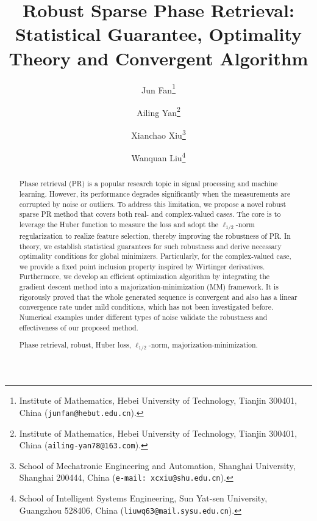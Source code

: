 \documentclass{article}
\numberwithin{equation}{section}
\begin{document}

\title{Robust Sparse Phase Retrieval: Statistical Guarantee, Optimality Theory and Convergent Algorithm}

\author{Jun Fan\thanks{Institute of Mathematics, Hebei University of Technology, Tianjin 300401, China  (\texttt{junfan@hebut.edu.cn}).} 
\and Ailing Yan\thanks{Institute of Mathematics, Hebei University of Technology, Tianjin 300401, China (\texttt{ailing-yan78@163.com}).}
\and Xianchao Xiu\thanks{School of Mechatronic Engineering and Automation, Shanghai University, Shanghai 200444, China (\texttt{e-mail: xcxiu@shu.edu.cn}).}
\and Wanquan Liu\thanks{School of Intelligent Systems Engineering, Sun Yat-sen University, Guangzhou 528406, China (\texttt{liuwq63@mail.sysu.edu.cn}).}}




\date{} 

\maketitle

\begin{abstract}

\noindent
Phase retrieval (PR) is a popular research topic in signal processing and machine learning. However, its performance degrades significantly when the measurements are corrupted by noise or outliers. To address this limitation, we propose a novel robust sparse PR method that covers both real- and complex-valued cases. The core is to leverage the Huber function to measure the loss and adopt the $\ell_{1/2}$-norm regularization to realize feature selection, thereby improving the robustness of PR. 
In theory, we establish statistical guarantees for such robustness and derive necessary optimality conditions for global minimizers. Particularly, for the complex-valued case, we provide a fixed point inclusion property inspired by Wirtinger derivatives. 
Furthermore, we develop an efficient optimization algorithm by integrating the gradient descent method into a majorization-minimization (MM) framework. It is rigorously proved that the whole generated sequence is convergent and also has a linear convergence rate under mild conditions, which has not been investigated before. 
Numerical examples under different types of noise validate the robustness and effectiveness of our proposed method.
\vskip10pt 

 {Phase retrieval, robust, Huber loss, $\ell_{1/2}$-norm, majorization-minimization.}

\end{abstract}
\end{document}
